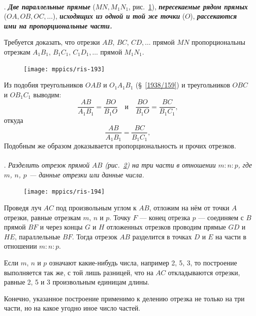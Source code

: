 \documentclass[oneside]{book}
\begin{document}
\paragraph{}\label{1938/183}
.
\textbf{\emph{Две параллельные прямые}} ($MN, M_1N_1$, рис.~\ref{1938/ris-193}), \textbf{\emph{пересекаемые рядом прямых}} ($OA, OB, OC, \dots$), \textbf{\emph{исходящих из одной и той же точки}} ($O$), \textbf{\emph{рассекаются ими на пропорциональные части.}}

Требуется доказать, что отрезки $AB$, $BC$, $CD,\dots$
прямой $MN$ пропорциональны отрезкам $A_1B_1$, $B_1C_1$, $C_1D_1,\dots$
прямой $M_1N_1$.

\begin{figure}[h!]
\centering
\texttt{[image: mppics/ris-193]}
\caption{}\label{1938/ris-193}
\end{figure}

Из подобия треугольников $OAB$ и $O_1A_1B_1$ (§~\ref{1938/159}) и треугольников $OBC$ и $OB_1C_1$ выводим:
\[\frac{AB}{A_1B_1}=\frac{BO}{B_1O}
\quad\text{и}\quad
\frac{BO}{B_1O}=\frac{BC}{B_1C_1},
\]
откуда
\[\frac{AB}{A_1B_1}=\frac{BC}{B_1C_1},
\]
Подобным же образом доказывается пропорциональность и прочих отрезков.

\paragraph{}\label{1938/184}
.
\emph{Разделить отрезок прямой $AB$ \emph{(рис.~\ref{1938/ris-194})} на три части в отношении $m:n:p$, где $m$, $n$, $p$ — данные отрезки или данные числа.}

\begin{figure}[h!]
\centering
\texttt{[image: mppics/ris-194]}
\caption{}\label{1938/ris-194}
\end{figure}

Проведя луч $AC$ под произвольным углом к $AB$, отложим на нём от точки $A$ отрезки, равные отрезкам $m$, $n$ и $p$.
Точку $F$ — конец отрезка $p$ — соединяем с $B$ прямой $BF$ и через концы $G$ и $H$ отложенных отрезков проводим прямые $GD$ и $HE$, параллельные $BF$.
Тогда отрезок $AB$ разделится в точках $D$ и $E$ на части в отношении $m:n:p$.

Если $m$, $n$ и $p$ означают какие-нибудь числа, например 2, 5, 3, то построение выполняется так же, с той лишь разницей, что на $AC$ откладываются отрезки, равные 2, 5 и 3 произвольным единицам длины.

Конечно, указанное построение применимо к делению отрезка не только на три части, но на какое угодно иное число частей.
\end{document}
